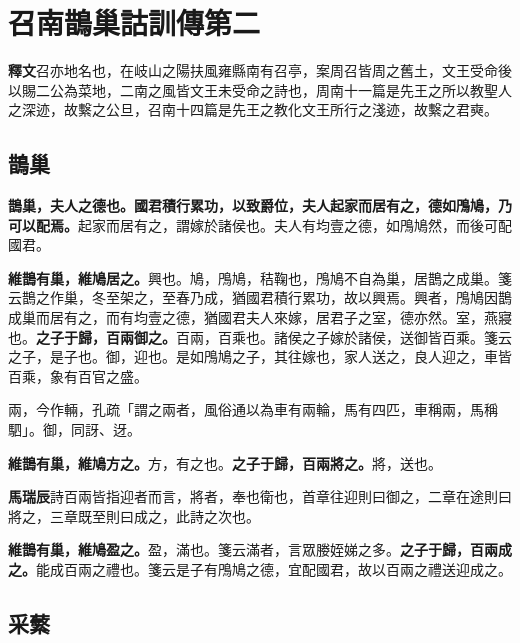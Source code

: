\chapter{召南鵲巢詁訓傳第二}

\begin{quoting}\textbf{釋文}召亦地名也，在岐山之陽扶風雍縣南有召亭，案周召皆周之舊土，文王受命後以賜二公為菜地，二南之風皆文王未受命之詩也，周南十一篇是先王之所以教聖人之深迹，故繫之公旦，召南十四篇是先王之教化文王所行之淺迹，故繫之君奭。\end{quoting}

\section{鵲巢}


\textbf{鵲巢，夫人之德也。國君積行累功，以致爵位，夫人起家而居有之，德如鳲鳩，乃可以配焉。}{\footnotesize 起家而居有之，謂嫁於諸侯也。夫人有均壹之德，如鳲鳩然，而後可配國君。}

\textbf{維鵲有巢，維鳩居之。}{\footnotesize 興也。鳩，鳲鳩，秸鞠也，鳲鳩不自為巢，居鵲之成巢。箋云鵲之作巢，冬至架之，至春乃成，猶國君積行累功，故以興焉。興者，鳲鳩因鵲成巢而居有之，而有均壹之德，猶國君夫人來嫁，居君子之室，德亦然。室，燕寢也。}\textbf{之子于歸，百兩御之。}{\footnotesize 百兩，百乘也。諸侯之子嫁於諸侯，送御皆百乘。箋云之子，是子也。御，迎也。是如鳲鳩之子，其往嫁也，家人送之，良人迎之，車皆百乘，象有百官之盛。}

\begin{quoting}兩，今作輛，孔疏「謂之兩者，風俗通以為車有兩輪，馬有四匹，車稱兩，馬稱駟」。御，同訝、迓。\end{quoting}

\textbf{維鵲有巢，維鳩方之。}{\footnotesize 方，有之也。}\textbf{之子于歸，百兩將之。}{\footnotesize 將，送也。}

\begin{quoting}\textbf{馬瑞辰}詩百兩皆指迎者而言，將者，奉也衛也，首章往迎則曰御之，二章在途則曰將之，三章既至則曰成之，此詩之次也。\end{quoting}

\textbf{維鵲有巢，維鳩盈之。}{\footnotesize 盈，滿也。箋云滿者，言眾媵姪娣之多。}\textbf{之子于歸，百兩成之。}{\footnotesize 能成百兩之禮也。箋云是子有鳲鳩之德，宜配國君，故以百兩之禮送迎成之。}

\section{采蘩}

